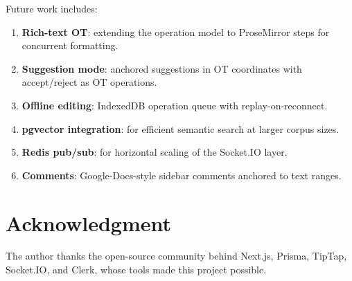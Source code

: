 \documentclass[conference]{IEEEtran}
\begin{document}
Future work includes:
\begin{enumerate}
\item \textbf{Rich-text OT}: extending the operation model to ProseMirror steps for concurrent formatting.
\item \textbf{Suggestion mode}: anchored suggestions in OT coordinates with accept/reject as OT operations.
\item \textbf{Offline editing}: IndexedDB operation queue with replay-on-reconnect.
\item \textbf{pgvector integration}: for efficient semantic search at larger corpus sizes.
\item \textbf{Redis pub/sub}: for horizontal scaling of the Socket.IO layer.
\item \textbf{Comments}: Google-Docs-style sidebar comments anchored to text ranges.
\end{enumerate}

\section*{Acknowledgment}

The author thanks the open-source community behind Next.js, Prisma, TipTap, Socket.IO, and Clerk, whose tools made this project possible.
\end{document}
